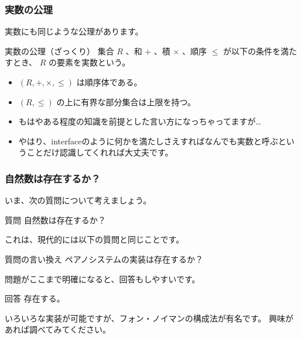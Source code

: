 \documentclass[dvipdfmx]{beamer}
\begin{document}
  \begin{frame}
    \frametitle{実数の公理}

    実数にも同じような公理があります。
    \begin{block}{実数の公理（ざっくり）}
      集合 $R$ 、和 $+$ 、積 $\times$ 、順序 $\leq$ が以下の条件を満たすとき、 $R$ の要素を実数という。
      \begin{itemize}
        \item $(R, +, \times, \leq)$ は順序体である。
        \item $(R, \leq)$ の上に有界な部分集合は上限を持つ。
      \end{itemize}
    \end{block}
    \begin{itemize}
      \item もはやある程度の知識を前提とした言い方になっちゃってますが…
      \item やはり、interfaceのように\alert{何かを満たしさえすればなんでも実数と呼ぶ}ということだけ認識してくれれば大丈夫です。
    \end{itemize}

  \end{frame}

  \begin{frame}
    \frametitle{自然数は存在するか？}

    いま、次の質問について考えましょう。
    \begin{block}{質問}
      自然数は存在するか？
    \end{block}

    \pause

    これは、現代的には以下の質問と同じことです。
    \begin{block}{質問の言い換え}
      ペアノシステムの実装は存在するか？
    \end{block}

    \pause

    問題がここまで明確になると、回答もしやすいです。
    \begin{block}{回答}
      存在する。
    \end{block}
    いろいろな実装が可能ですが、フォン・ノイマンの構成法が有名です。
    興味があれば調べてみてください。

  \end{frame}
\end{document}
